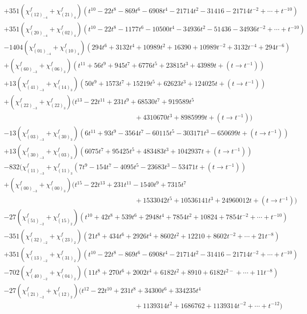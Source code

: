 \documentclass[letterpaper, 11pt]{article}
\newcommand{\nn}{\nonumber}
\begin{document}
{\begin{align}
&+351(\chi^f_{(12)_{-4}}+\chi^f_{(21)_4})(t^{10}-22 t^8-869 t^6-6908 t^4-21714 t^2-31416-21714t^{-2}+\cdots+t^{-10})\nn\\
&+351(\chi^f_{(20)_{-4}}+\chi^f_{(02)_4})(t^{10}-22 t^8-1177 t^6-10500 t^4-34936 t^2-51436-34936 t^{-2}+\cdots+t^{-10})\nn\\
&-1404(\chi^f_{(01)_{-4}}+\chi^f_{(10)_4})(294 t^6+3132 t^4+10989 t^2+16390+10989 t^{-2}+3132t^{-4}+294t^{-6})\nn\\
&+(\chi^f_{(60)_{-3}}+\chi^f_{(06)_3})(t^{11}+56 t^9+945 t^7+6776 t^5+23815 t^3+43989t+(t\rightarrow t^{-1}))\nn\\
&+13(\chi^f_{(41)_{-3}}+\chi^f_{(14)_3})(50 t^9+1573 t^7+15219 t^5+62623 t^3+124025t+(t\rightarrow t^{-1}))\nn\\
&+(\chi^f_{(22)_{-3}}+\chi^f_{(22)_3})(t^{13}-22 t^{11}+231 t^9+68530 t^7+919589 t^5\nn\\
&\hspace{8cm}+4310670 t^3+8985999t+(t\rightarrow t^{-1}))\nn\\
&-13(\chi^f_{(03)_{-3}}+\chi^f_{(30)_3})(6 t^{11}+93 t^9-3564 t^7-60115 t^5-303171 t^3-650699t+(t\rightarrow t^{-1}))\nn\\
&+13(\chi^f_{(30)_{-3}}+\chi^f_{(03)_3})(6075 t^7+95425 t^5+483483 t^3+1042937t+(t\rightarrow t^{-1}))\nn\\
&-832(\chi^f_{(11)_{-3}}+\chi^f_{(11)_3}(7 t^9-154 t^7-4095 t^5-23683 t^3-53471t+(t\rightarrow t^{-1}))\nn\\
&+(\chi^f_{(00)_{-3}}+\chi^f_{(00)_3})(t^{15}-22 t^{13}+231 t^{11}-1540 t^9+7315 t^7\nn\\
&\hspace{8cm}+1533042 t^5+10536141 t^3+24960012t+(t\rightarrow t^{-1}))\nn\\
&-27(\chi^f_{(51)_{-2}}+\chi^f_{(15)_2})(t^{10}+42 t^8+539 t^6+2948 t^4+7854 t^2+10824+7854t^{-2}+\cdots+t^{-10})\nn\\
&-351(\chi^f_{(32)_{-2}}+\chi^f_{(23)_2})(21 t^8+434 t^6+2926 t^4+8602 t^2+12210+8602t^{-2}+\cdots+21t^{-8})\nn\\
&+351(\chi^f_{(13)_{-2}}+\chi^f_{(31)_2})(t^{10}-22 t^8-869 t^6-6908 t^4-21714 t^2-31416-21714t^{-2}+\cdots+t^{-10})\nn\\
&-702(\chi^f_{(40)_{-2}}+\chi^f_{(04)_2})(11 t^8+270 t^6+2002 t^4+6182 t^2+8910+6182t^{2-}+\cdots+11t^{-8})\nn\\
&-27(\chi^f_{(21)_{-2}}+\chi^f_{(12)_2})(t^{12}-22 t^{10}+231 t^8+34300 t^6+334235 t^4\nn\\
&\hspace{8cm}+1139314 t^2+1686762+1139314 t^{-2}+\cdots+t^{-12})\nn\\

\end{align}}
\end{document}
